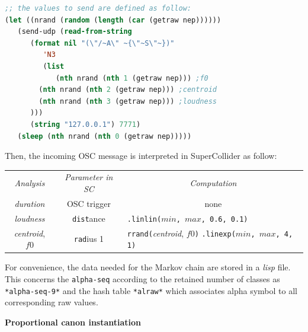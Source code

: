 \smallskip

\begin{lstlisting}[basicstyle=\footnotesize\ttfamily,language=Lisp]
;; the values to send are defined as follow:
(let ((nrand (random (length (car (getraw nep))))))
   (send-udp (read-from-string 
      (format nil "(\"/~A\" ~{\"~S\"~})"
         'N3
         (list
            (nth nrand (nth 1 (getraw nep))) ;f0
	    (nth nrand (nth 2 (getraw nep))) ;centroid
	    (nth nrand (nth 3 (getraw nep))) ;loudness
	  ))) 
      (string "127.0.0.1") 7771)
   (sleep (nth nrand (nth 0 (getraw nep)))))
\end{lstlisting}

\bigskip
\noindent Then, the incoming OSC message is interpreted in SuperCollider as follow:

\bigskip

\begin{tabular}{c|c|l}
\rowcolor{lightgray} \textit{Analysis}  & \textit{Parameter in SC}  & \multicolumn{1}{c}{\textit{Computation}}\\
\textsl{duration} &  OSC trigger   & \multicolumn{1}{c}{none}  \\
\textsl{loudness} &  \texttt{dist}ance   &  \texttt{.linlin($min$, $max$, 0.6, 0.1)} \\
\textsl{centroid}, $f0$ &  \texttt{rad}ius 1 & \makecell{\texttt{rrand(}\textsl{centroid}, $f0$\texttt{)}\\ \texttt{.linexp($min$, $max$, 4, 1)}} \\
\end{tabular}
\label{tab:apc}

  \bigskip

 For convenience, the data needed for the Markov chain are stored in a \textsl{lisp} file. This concerns the \texttt{alpha-seq} according to the retained number of classes as \texttt{*alpha-seq-9*} and the hash table \texttt{*alraw*} which associates alpha symbol to all corresponding raw values.

\newpage
  
  \textbf{
  Proportional canon instantiation }
  


